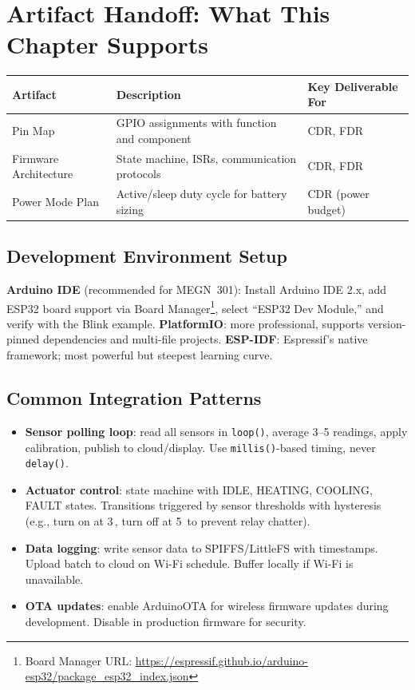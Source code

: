 \section{Artifact Handoff: What This Chapter Supports}
\begin{table}[htbp]\centering\small
\begin{tabularx}{\textwidth}{l X l}
\toprule
\textbf{Artifact} & \textbf{Description} & \textbf{Key Deliverable For} \\
\midrule
Pin Map & GPIO assignments with function and component & CDR, FDR \\
Firmware Architecture & State machine, ISRs, communication protocols & CDR, FDR \\
Power Mode Plan & Active/sleep duty cycle for battery sizing & CDR (power budget) \\
\bottomrule
\end{tabularx}
\end{table}


\subsection{Development Environment Setup}
\textbf{Arduino IDE} (recommended for MEGN~301): Install Arduino IDE 2.x, add ESP32 board support via Board Manager\footnote{Board Manager URL: \url{https://espressif.github.io/arduino-esp32/package_esp32_index.json}}, select ``ESP32 Dev Module,'' and verify with the Blink example. \textbf{PlatformIO}: more professional, supports version-pinned dependencies and multi-file projects. \textbf{ESP-IDF}: Espressif's native framework; most powerful but steepest learning curve.

\subsection{Common Integration Patterns}
\begin{itemize}[leftmargin=1.5em]
\item \textbf{Sensor polling loop}: read all sensors in \texttt{loop()}, average 3--5 readings, apply calibration, publish to cloud/display. Use \texttt{millis()}-based timing, never \texttt{delay()}.
\item \textbf{Actuator control}: state machine with IDLE, HEATING, COOLING, FAULT states. Transitions triggered by sensor thresholds with hysteresis (e.g., turn on at 3\,\degC{}, turn off at 5\,\degC{} to prevent relay chatter).
\item \textbf{Data logging}: write sensor data to SPIFFS/LittleFS with timestamps. Upload batch to cloud on Wi-Fi schedule. Buffer locally if Wi-Fi is unavailable.
\item \textbf{OTA updates}: enable ArduinoOTA for wireless firmware updates during development. Disable in production firmware for security.
\end{itemize}

